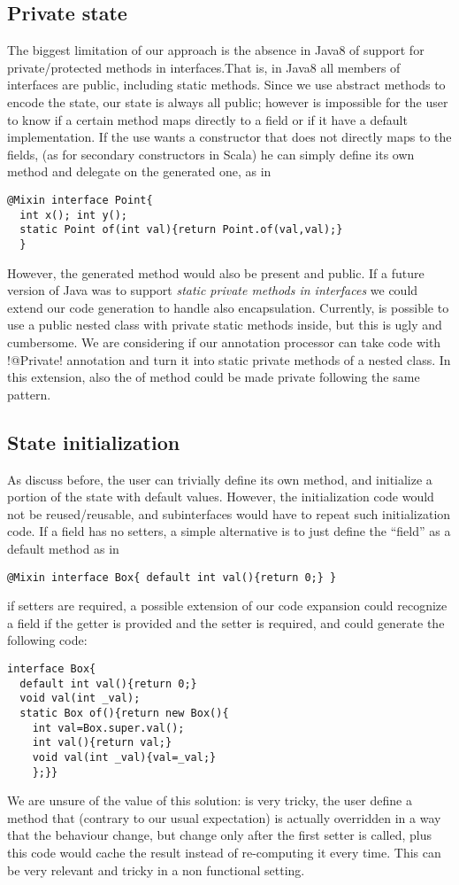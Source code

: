 \subsection{Private state}
The biggest limitation of our approach is the absence in Java8 of support for private/protected methods in interfaces.That is, in Java8 all members of interfaces are public, including static methods.
Since we use abstract methods to encode the state, our state is always all public; however is impossible for the user to know if a certain method maps directly to a field or if it have a default implementation.
If the use wants a constructor that does not directly maps to the fields, (as for secondary constructors in Scala) he can simply define its own \Q@of@ method and delegate on the generated one, as in
\begin{lstlisting}
@Mixin interface Point{
  int x(); int y();
  static Point of(int val){return Point.of(val,val);}  
  }
\end{lstlisting}
However, the generated \Q@of@ method would also be present and public.
If a future version of Java was to support \emph{static private methods in interfaces} we could extend our code generation to handle also encapsulation.
Currently, is possible to use a public nested class with private static methods inside, but this is ugly and cumbersome. We are considering if our annotation processor can take code with \Q!@Private! annotation and turn it into static private methods of a nested class. In this extension,  also the of method could be made private following the same pattern. 

\subsection{State initialization}

As discuss before, the user can trivially define its own \Q@of@ method, and initialize a portion of the state with default values.
However, the initialization code would not be reused/reusable, and subinterfaces would have to repeat such initialization code.
If a field has no setters, a simple alternative is to just define the ``field'' as a default method as in 
\begin{lstlisting}
@Mixin interface Box{ default int val(){return 0;} }
\end{lstlisting}
if setters are required, a possible extension of our code expansion could recognize a field if the getter is provided and the setter is required, and could generate the following code:
\begin{lstlisting}
interface Box{ 
  default int val(){return 0;} 
  void val(int _val);
  static Box of(){return new Box(){
    int val=Box.super.val();
    int val(){return val;}
    void val(int _val){val=_val;}
    };}}
\end{lstlisting}
We are unsure of the value of this solution: is very tricky, the user define a method that (contrary to our usual expectation) is actually overridden in a way that the behaviour change, but change only after the first setter is called, plus this code would cache the result instead of re-computing it every time. This can be very relevant and tricky in a non functional setting.

